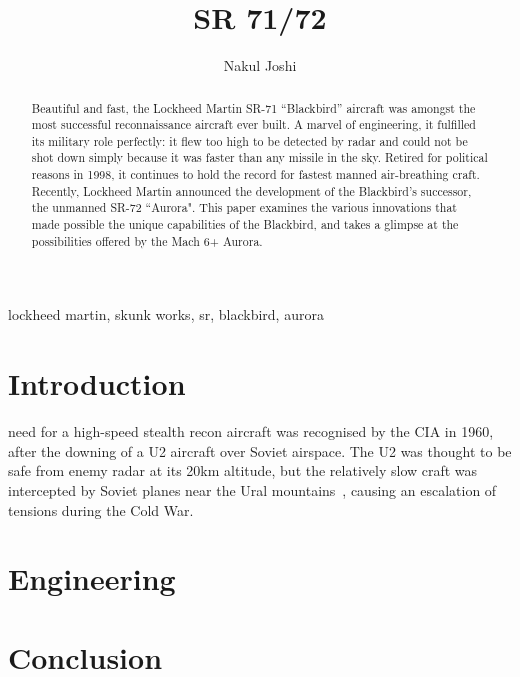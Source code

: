 \documentclass[]{IEEEtran}
\title{SR 71/72}
\author{Nakul Joshi}
\begin{document}
\maketitle
\begin{abstract}

	Beautiful and fast, the Lockheed Martin SR-71 ``Blackbird'' aircraft was amongst the most successful reconnaissance aircraft ever built. A marvel of engineering, it fulfilled its military role perfectly: it flew too high to be detected by radar and could not be shot down simply because it was faster than any missile in the sky. Retired for political reasons in 1998, it continues to hold the record for fastest manned air-breathing craft. Recently, Lockheed Martin announced the development of the Blackbird's successor, the unmanned SR-72 ``Aurora". This paper examines the various innovations that made possible the unique capabilities of the Blackbird, and takes a glimpse at the possibilities offered by the Mach 6+ Aurora.
	 
\end{abstract}
\begin{IEEEkeywords}
lockheed martin, skunk works, sr, blackbird, aurora
\end{IEEEkeywords}


\section{Introduction}
		need for a high-speed stealth recon aircraft was recognised by the CIA in 1960, after the downing of a U2 aircraft over Soviet airspace. The U2 was thought to be safe from enemy radar at its 20km altitude, but the relatively slow craft was intercepted by Soviet planes near the Ural mountains~\cite{u2}, causing an escalation of tensions during the Cold War.
	
	

	
\section{Engineering}

\section{Conclusion}


{}

\end{document}

